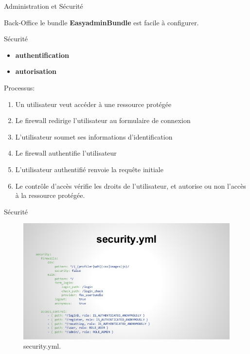 \documentclass[french]{beamer}
\begin{document}
\begin{frame}{Administration et Sécurité}
\begin{alertblock}{Back-Office}
le bundle \textbf{EasyadminBundle}  est facile à configurer.
\end{alertblock}	


\begin{alertblock}{Sécurité}
\begin{itemize}
\item \textbf{authentification} 
\item \textbf{autorisation}
\end{itemize}

Processus:
\begin{enumerate}
\item    Un utilisateur veut accéder à une ressource protégée 

 \item    Le firewall redirige l'utilisateur au formulaire de connexion 

  \item   L'utilisateur soumet ses informations d'identification 

 \item    Le firewall authentifie l'utilisateur 

 \item    L'utilisateur authentifié renvoie la requête initiale 

 \item    Le contrôle d'accès vérifie les droits de l'utilisateur, et autorise ou non l'accès à la ressource protégée.
\end{enumerate}

\end{alertblock}	
	
	
\end{frame}

\begin{frame}{Sécurité}
\begin{center}
\begin{figure}[htp]
  \centering
  \includegraphics[width=12cm]{s.jpg}
  \caption{security.yml.}
  \label{fig:une-autre-image}
\end{figure}

\end{center}

\end{frame}
\end{document}
